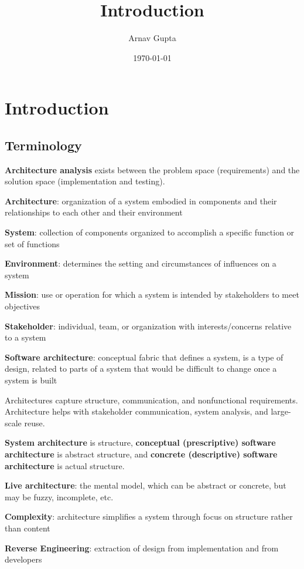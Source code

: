 \documentclass[11pt]{article}
\author{Arnav Gupta}
\date{\today}
\title{Introduction}
\begin{document}
\maketitle
\tableofcontents

\section{Introduction}
\label{sec:org05d548f}
\subsection{Terminology}
\label{sec:orged1462d}
\textbf{Architecture analysis} exists between the problem space (requirements) and the solution space
(implementation and testing).

\textbf{Architecture}: organization of a system embodied in components and their relationships to each other and their environment

\textbf{System}: collection of components organized to accomplish a specific function or set of functions

\textbf{Environment}: determines the setting and circumstances of influences on a system

\textbf{Mission}: use or operation for which a system is intended by stakeholders to meet objectives

\textbf{Stakeholder}: individual, team, or organization with interests/concerns relative to a system


\textbf{Software architecture}: conceptual fabric that defines a system, is a type of design, related to parts of a system that would be difficult to change once a system is built

Architectures capture structure, communication, and nonfunctional requirements.
Architecture helps with stakeholder communication, system analysis, and large-scale reuse.

\textbf{System architecture} is structure, \textbf{conceptual (prescriptive) software architecture} is abstract structure, and \textbf{concrete (descriptive) software architecture} is actual structure.

\textbf{Live architecture}: the mental model, which can be abstract or concrete, but may be fuzzy, incomplete, etc.

\textbf{Complexity}: architecture simplifies a system through focus on structure rather than content

\textbf{Reverse Engineering}: extraction of design from implementation and from developers
\end{document}
